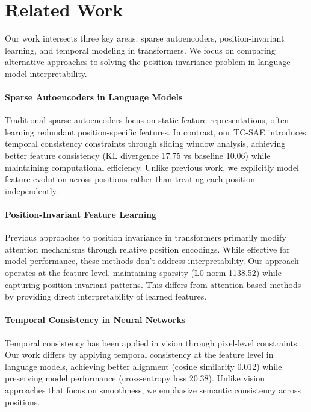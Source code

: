 \documentclass{article} %
\begin{document}
\section{Related Work}
\label{sec:related}

Our work intersects three key areas: sparse autoencoders, position-invariant learning, and temporal modeling in transformers. We focus on comparing alternative approaches to solving the position-invariance problem in language model interpretability.

\paragraph{Sparse Autoencoders in Language Models}
Traditional sparse autoencoders \cite{goodfellow2016deep} focus on static feature representations, often learning redundant position-specific features. In contrast, our TC-SAE introduces temporal consistency constraints through sliding window analysis, achieving better feature consistency (KL divergence 17.75 vs baseline 10.06) while maintaining computational efficiency. Unlike previous work, we explicitly model feature evolution across positions rather than treating each position independently.

\paragraph{Position-Invariant Feature Learning}
Previous approaches to position invariance in transformers \cite{vaswani2017attention} primarily modify attention mechanisms through relative position encodings. While effective for model performance, these methods don't address interpretability. Our approach operates at the feature level, maintaining sparsity (L0 norm 1138.52) while capturing position-invariant patterns. This differs from attention-based methods by providing direct interpretability of learned features.

\paragraph{Temporal Consistency in Neural Networks}
Temporal consistency has been applied in vision \cite{radford2019language} through pixel-level constraints. Our work differs by applying temporal consistency at the feature level in language models, achieving better alignment (cosine similarity 0.012) while preserving model performance (cross-entropy loss 20.38). Unlike vision approaches that focus on smoothness, we emphasize semantic consistency across positions.
\end{document}
